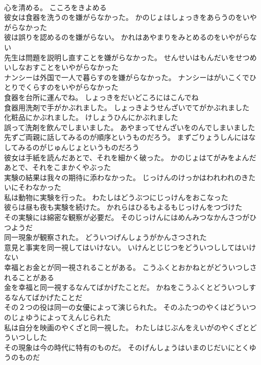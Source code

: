 \documentclass[8pt]{extreport}
\begin{document}
\begin{CJK}{UTF8}{min}
\\	心を清める。	こころをきよめる 
\\	彼女は食器を洗うのを嫌がらなかった。	かのじょはしょっきをあらうのをいやがらなかった 
\\	彼は誤りを認めるのを嫌がらない。	かれはあやまりをみとめるのをいやがらない 
\\	先生は問題を説明し直すことを嫌がらなかった。	せんせいはもんだいをせつめいしなおすことをいやがらなかった 
\\	ナンシーは外国で一人で暮らすのを嫌がらなかった。	ナンシーはがいこくでひとりでくらすのをいやがらなかった 
\\	食器を台所に運んでね。	しょっきをだいどころにはこんでね 
\\	食器用洗剤で手がかぶれました。	しょっきようせんざいでてがかぶれました 
\\	化粧品にかぶれました。	けしょうひんにかぶれました 
\\	誤って洗剤を飲んでしまいました。	あやまってせんざいをのんでしまいました 
\\	先ずご両親に話してみるのが順序というものだろう。	まずごりょうしんにはなしてみるのがじゅんじょというものだろう 
\\	彼女は手紙を読んだあとで、それを細かく破った。	かのじょはてがみをよんだあとで、それをこまかくやぶった 
\\	実験の結果は我々の期待に添わなかった。	じっけんのけっかはわれわれのきたいにそわなかった 
\\	私は動物に実験を行った。	わたしはどうぶつにじっけんをおこなった 
\\	彼らは昼も夜も実験を続けた。	かれらはひるもよるもじっけんをつづけた 
\\	その実験には綿密な観察が必要だ。	そのじっけんにはめんみつなかんさつがひつようだ 
\\	同一現象が観察された。	どういつげんしょうがかんさつされた 
\\	意見と事実を同一視してはいけない。	いけんとじじつをどういつししてはいけない 
\\	幸福とお金とが同一視されることがある。	こうふくとおかねとがどういつしされることがある 
\\	金を幸福と同一視するなんてばかげたことだ。	かねをこうふくとどういつしするなんてばかげたことだ 
\\	その２つの役は同一の女優によって演じられた。	そのふたつのやくはどういつのじょゆうによってえんじられた 
\\	私は自分を映画のやくざと同一視した。	わたしはじぶんをえいがのやくざとどういつしした 
\\	その現象は今の時代に特有のものだ。	そのげんしょうはいまのじだいにとくゆうのものだ 

\end{CJK}
\end{document}
